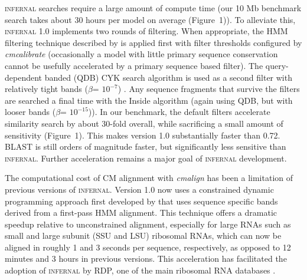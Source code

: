 \textsc{infernal} searches require a large amount of compute time (our
10 Mb benchmark search takes about 30 hours per model on average
(Figure~1)). To alleviate this, \textsc{infernal} 1.0 implements two
rounds of filtering.  When appropriate, the HMM filtering technique
described by \citet{WeinbergRuzzo06} is applied first with filter
thresholds configured by \emph{cmcalibrate} (occasionally a model with
little primary sequence conservation cannot be usefully accelerated by
a primary sequence based filter).  The query-dependent banded (QDB)
CYK search algorithm is used as a second filter with relatively tight
bands ($\beta$= $10^{-7}$) \citep{NawrockiEddy07}.  Any sequence
fragments that survive the filters are searched a final time with the
Inside algorithm (again using QDB, but with looser bands ($\beta$=
$10^{-15}$)).  In our benchmark, the default filters accelerate
similarity search by about 30-fold overall, while sacrificing a small
amount of sensitivity (Figure~1). This makes version 1.0 substantially
faster than 0.72. \textsc{BLAST} is still orders of magnitude faster,
but significantly less sensitive than \textsc{infernal}. Further
acceleration remains a major goal of \textsc{infernal} development.

The computational cost of CM alignment with \emph{cmalign} has been a
limitation of previous versions of \textsc{infernal}. Version 1.0 now
uses a constrained dynamic programming approach first developed by
\citet{Brown00} that uses sequence specific bands derived from a
first-pass HMM alignment. This technique offers a dramatic speedup
relative to unconstrained alignment, especially for large RNAs such as
small and large subunit (SSU and LSU) ribosomal RNAs, which can now be
aligned in roughly 1 and 3 seconds per sequence, respectively, as
opposed to 12 minutes and 3 hours in previous versions.  This
acceleration has facilitated the adoption of \textsc{infernal} by RDP,
one of the main ribosomal RNA databases \citep{Cole09}.


